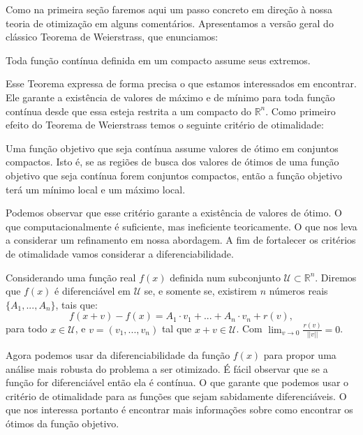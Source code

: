 \par Como na primeira seção faremos aqui um passo concreto em direção à nossa teoria de otimização em alguns comentários.  Apresentamos a versão geral do clássico Teorema de Weierstrass, que enunciamos:

\begin{theorem}
  Toda função contínua definida em um compacto assume seus extremos.
\end{theorem}

\par Esse Teorema expressa de forma precisa o que estamos interessados em encontrar. Ele garante a existência de valores de máximo e de mínimo para toda função contínua desde que essa esteja restrita a um compacto do $\mathbb{R}^n$. Como primeiro efeito do Teorema de Weierstrass temos o seguinte critério de otimalidade:

\begin{theorem}
  Uma função objetivo que seja contínua assume valores de ótimo em conjuntos compactos. Isto é, se as regiões de busca dos valores de ótimos de uma função objetivo que seja contínua forem conjuntos compactos, então a função objetivo terá um mínimo local e um máximo local. 
\end{theorem}


\par Podemos observar que esse critério garante a existência de valores de ótimo. O que computacionalmente é suficiente, mas ineficiente teoricamente. O que nos leva a considerar um refinamento em nossa abordagem. A fim de fortalecer os critérios de otimalidade vamos considerar a diferenciabilidade. 

\begin{definition}
  Considerando uma função real $f(x)$ definida num subconjunto $\mathcal{U} \subset \mathbb{R}^n$. Diremos que $f(x)$ é diferenciável em $\mathcal{U}$ se, e somente se, existirem $n$ números reais $\{A_1, ..., A_n\}$, tais que:
  \begin{equation}
    f(x+v)- f(x)= A_1 \cdot v_1 + ... + A_n \cdot v_n + r(v),
  \end{equation}
  para todo $x \in \mathcal{U}$, e $v = (v_1, ..., v_n)$ tal que $x+v \in \mathcal{U}$. Com $\lim_{v\rightarrow 0} \frac{r(v)}{||v||}=0$.
\end{definition}

\par Agora podemos usar da diferenciabilidade da função $f(x)$ para propor uma análise mais robusta do problema a ser otimizado. É fácil observar que se a função for diferenciável então ela é contínua. O que garante que podemos usar o critério de otimalidade para as funções que sejam sabidamente diferenciáveis. O que nos interessa portanto é encontrar mais informações sobre como encontrar os ótimos da função objetivo.

